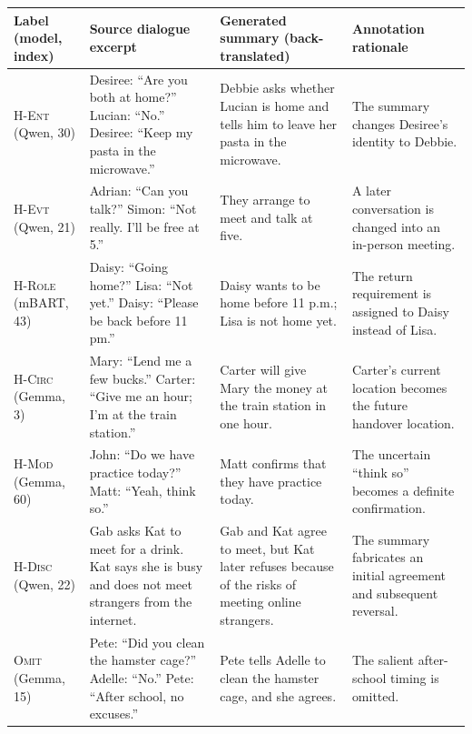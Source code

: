 \documentclass[11pt]{article}
\begin{document}
\begin{table}[t]
\centering
\scriptsize
\setlength{\tabcolsep}{3pt}
\renewcommand{\arraystretch}{1.08}
\begin{tabularx}{\textwidth}{@{}lXXX@{}}
\toprule
Label (model, index) & Source dialogue excerpt & Generated summary (back-translated) & Annotation rationale \\
\midrule
\textsc{H-Ent} (Qwen, 30) &
Desiree: ``Are you both at home?'' Lucian: ``No.'' Desiree: ``Keep my pasta in the microwave.'' &
Debbie asks whether Lucian is home and tells him to leave her pasta in the microwave. &
The summary changes Desiree's identity to Debbie. \\

\textsc{H-Evt} (Qwen, 21) &
Adrian: ``Can you talk?'' Simon: ``Not really. I'll be free at 5.'' &
They arrange to meet and talk at five. &
A later conversation is changed into an in-person meeting. \\

\textsc{H-Role} (mBART, 43) &
Daisy: ``Going home?'' Lisa: ``Not yet.'' Daisy: ``Please be back before 11 pm.'' &
Daisy wants to be home before 11 p.m.; Lisa is not home yet. &
The return requirement is assigned to Daisy instead of Lisa. \\

\textsc{H-Circ} (Gemma, 3) &
Mary: ``Lend me a few bucks.'' Carter: ``Give me an hour; I'm at the train station.'' &
Carter will give Mary the money at the train station in one hour. &
Carter's current location becomes the future handover location. \\

\textsc{H-Mod} (Gemma, 60) &
John: ``Do we have practice today?'' Matt: ``Yeah, think so.'' &
Matt confirms that they have practice today. &
The uncertain ``think so'' becomes a definite confirmation. \\

\textsc{H-Disc} (Qwen, 22) &
Gab asks Kat to meet for a drink. Kat says she is busy and does not meet strangers from the internet. &
Gab and Kat agree to meet, but Kat later refuses because of the risks of meeting online strangers. &
The summary fabricates an initial agreement and subsequent reversal. \\

\textsc{Omit} (Gemma, 15) &
Pete: ``Did you clean the hamster cage?'' Adelle: ``No.'' Pete: ``After school, no excuses.'' &
Pete tells Adelle to clean the hamster cage, and she agrees. &
The salient after-school timing is omitted. \\


\end{tabularx}
\end{table}
\end{document}
